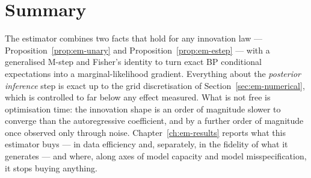 \section{Summary}

The estimator combines two facts that hold for any innovation law ---
Proposition~\ref{prop:em-unary} and Proposition~\ref{prop:em-estep} --- with a
generalised M-step and Fisher's identity to turn exact BP conditional
expectations into a marginal-likelihood gradient. Everything about the
\emph{posterior inference} step is exact up to the grid discretisation of
Section~\ref{sec:em-numerical}, which is controlled to far below any effect
measured. What is not free is optimisation time: the innovation shape is an
order of magnitude slower to converge than the autoregressive coefficient,
and by a further order of magnitude once observed only through noise.
Chapter~\ref{ch:em-results} reports what this estimator buys --- in data
efficiency and, separately, in the fidelity of what it generates --- and where,
along axes of model capacity and model misspecification, it stops buying
anything.
